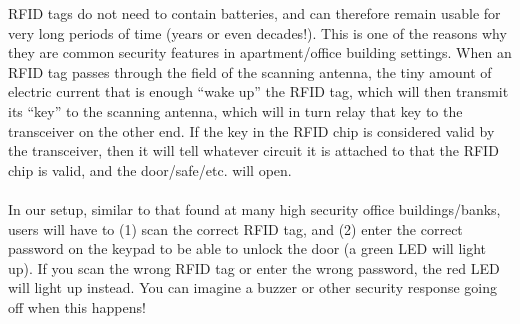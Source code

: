 \documentclass{article}
\begin{document}
RFID tags do not need to contain batteries, and can therefore remain usable for very
long periods of time (years or even decades!). This is one of the reasons why they
are common security features in apartment/office building settings. When an RFID tag
passes through the field of the scanning antenna, the tiny amount of electric current
that is enough ``wake up'' the RFID tag, which will then transmit its ``key'' to the
scanning antenna, which will in turn relay that key to the transceiver on the other
end. If the key in the RFID chip is considered valid by the transceiver, then it will
tell whatever circuit it is attached to that the RFID chip is valid, and the
door/safe/etc. will open.
\\
\\
In our setup, similar to that found at many high security office buildings/banks,
users will have to (1) scan the correct RFID tag, and (2) enter the correct password
on the keypad to be able to unlock the door (a green LED will light up). If you scan
the wrong RFID tag or enter the wrong password, the red LED will light up
instead. You can imagine a buzzer or other security response going off when this
happens!

\newpage
\end{document}
